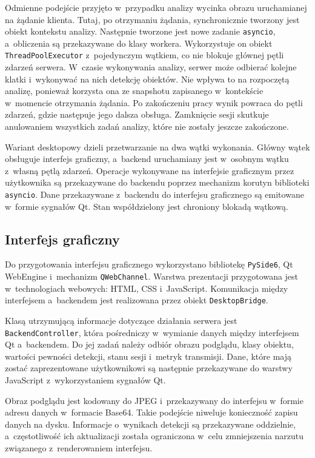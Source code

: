 Odmienne podejście przyjęto w~przypadku analizy wycinka obrazu uruchamianej na żądanie klienta. Tutaj, po otrzymaniu żądania, synchronicznie tworzony jest obiekt kontekstu analizy. Następnie tworzone jest nowe zadanie \texttt{asyncio}, a~obliczenia są przekazywane do klasy workera. Wykorzystuje on obiekt \texttt{ThreadPoolExecutor} z~pojedynczym wątkiem, co nie blokuje głównej pętli zdarzeń serwera. W~czasie wykonywania analizy, serwer może odbierać kolejne klatki i~wykonywać na nich detekcję obiektów. Nie wpływa to na rozpoczętą analizę, ponieważ korzysta ona ze snapshotu zapisanego w~kontekście w~momencie otrzymania żądania. Po zakończeniu pracy wynik powraca do pętli zdarzeń, gdzie następuje jego dalsza obsługa. Zamknięcie sesji skutkuje anulowaniem wszystkich zadań analizy, które nie zostały jeszcze zakończone.

Wariant desktopowy dzieli przetwarzanie na dwa wątki wykonania. Główny wątek obsługuje interfejs graficzny, a~backend uruchamiany jest w~osobnym wątku z~własną pętlą zdarzeń. Operacje wykonywane na interfejsie graficznym przez użytkownika są przekazywane do backendu poprzez mechanizm korutyn biblioteki \texttt{asyncio}. Dane przekazywane z~backendu do interfejsu graficznego są emitowane w~formie sygnałów Qt. Stan współdzielony jest chroniony blokadą wątkową.

\subsection{Interfejs graficzny}

Do przygotowania interfejsu graficznego wykorzystano bibliotekę \texttt{PySide6}, Qt WebEngine i~mechanizm \texttt{QWebChannel}. Warstwa prezentacji przygotowana jest w~technologiach webowych: HTML, CSS i~JavaScript. Komunikacja między interfejsem a~backendem jest realizowana przez obiekt \texttt{DesktopBridge}.

Klasą utrzymującą informacje dotyczące działania serwera jest \texttt{BackendController}, która pośredniczy w~wymianie danych między interfejsem Qt a~backendem. Do jej zadań należy odbiór obrazu podglądu, klasy obiektu, wartości pewności detekcji, stanu sesji i~metryk transmisji. Dane, które mają zostać zaprezentowane użytkownikowi są następnie przekazywane do warstwy JavaScript z~wykorzystaniem sygnałów Qt.

Obraz podglądu jest kodowany do JPEG i~przekazywany do interfejsu w~formie adresu danych w~formacie Base64. Takie podejście niweluje konieczność zapisu danych na dysku. Informacje o~wynikach detekcji są przekazywane oddzielnie, a~częstotliwość ich aktualizacji została ograniczona w~celu zmniejszenia narzutu związanego z~renderowaniem interfejsu.

